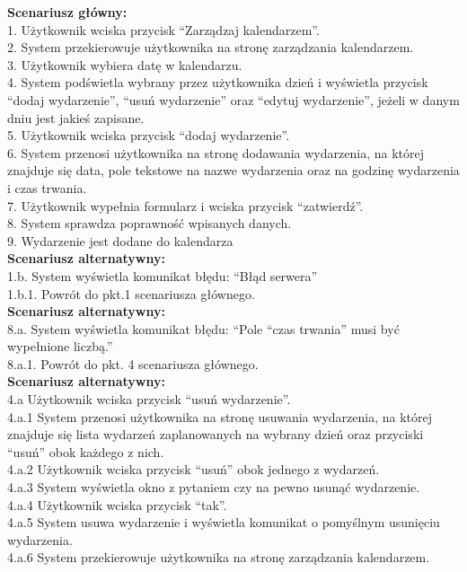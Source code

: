 \begin{enumerate}[label=(\Roman*)]
\textbf{Scenariusz główny:}\\
1. Użytkownik wciska przycisk “Zarządzaj kalendarzem”.\\
2. System przekierowuje użytkownika na stronę zarządzania kalendarzem.\\
3. Użytkownik wybiera datę w kalendarzu.\\
4. System podświetla wybrany przez użytkownika dzień i wyświetla przycisk “dodaj
wydarzenie”, “usuń wydarzenie” oraz “edytuj wydarzenie”, jeżeli w danym dniu jest
jakieś zapisane.\\
5. Użytkownik wciska przycisk “dodaj wydarzenie”.\\
6. System przenosi użytkownika na stronę dodawania wydarzenia, na której znajduje się
data, pole tekstowe na nazwe wydarzenia oraz na godzinę wydarzenia i czas trwania.\\
7. Użytkownik wypełnia formularz i wciska przycisk “zatwierdź”.\\
8. System sprawdza poprawność wpisanych danych.\\
9. Wydarzenie jest dodane do kalendarza\\
\textbf{Scenariusz alternatywny:}\\
1.b. System wyświetla komunikat błędu: “Błąd serwera”\\
1.b.1. Powrót do pkt.1 scenariusza głównego.\\
\textbf{Scenariusz alternatywny:}\\
8.a. System wyświetla komunikat błędu: “Pole “czas trwania” musi być wypełnione liczbą.”\\
8.a.1. Powrót do pkt. 4 scenariusza głównego.\\
\textbf{Scenariusz alternatywny:}\\
4.a Użytkownik wciska przycisk “usuń wydarzenie”.\\
4.a.1 System przenosi użytkownika na stronę usuwania wydarzenia, na której znajduje się
lista wydarzeń zaplanowanych na wybrany dzień oraz przyciski “usuń” obok każdego z nich.\\
4.a.2 Użytkownik wciska przycisk “usuń” obok jednego z wydarzeń.\\
4.a.3 System wyświetla okno z pytaniem czy na pewno usunąć wydarzenie.\\
4.a.4 Użytkownik wciska przycisk “tak”.\\
4.a.5 System usuwa wydarzenie i wyświetla komunikat o pomyślnym usunięciu wydarzenia.\\
4.a.6 System przekierowuje użytkownika na stronę zarządzania kalendarzem.\\

\end{enumerate}
